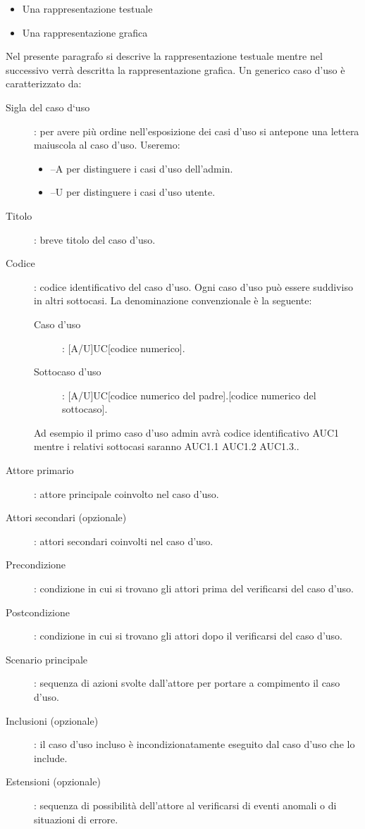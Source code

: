 \documentclass[../norme-di-progetto.tex]{subfiles}
\begin{document}
\begin{itemize}
  \item Una rappresentazione testuale
  \item Una rappresentazione grafica
\end{itemize}

Nel presente paragrafo si descrive la rappresentazione testuale mentre nel successivo verrà descritta la rappresentazione grafica. Un generico caso d'uso è caratterizzato da:
\begin{description}
  \item [Sigla del caso d`uso]: per avere più ordine nell'esposizione dei casi d'uso si antepone una lettera maiuscola al caso d'uso. Useremo:
  \begin{itemize}
   \item --A per distinguere i casi d'uso dell'admin.
   \item --U per distinguere i casi d'uso utente.
  \end{itemize}
  \item [Titolo]: breve titolo del caso d'uso.
  \item [Codice]: codice identificativo del caso d'uso. Ogni caso d'uso può essere suddiviso in altri sottocasi. La denominazione convenzionale è la seguente:
        \begin{description}
          \item [Caso d'uso]: [A/U]UC[codice numerico].
          \item [Sottocaso d'uso]: [A/U]UC[codice numerico del padre].[codice numerico del sottocaso].
        \end{description}
        Ad esempio il primo caso d'uso admin avrà codice identificativo AUC1 mentre i relativi sottocasi saranno AUC1.1 AUC1.2 AUC1.3..
  \item [Attore primario]: attore principale coinvolto nel caso d'uso.
  \item [Attori secondari (opzionale)]: attori secondari coinvolti nel caso d'uso.
  \item [Precondizione]: condizione in cui si trovano gli attori prima del verificarsi del caso d'uso.
  \item [Postcondizione]: condizione in cui si trovano gli attori dopo il verificarsi del caso d'uso.
  \item [Scenario principale]: sequenza di azioni svolte dall'attore per portare a compimento il caso d'uso.
  \item [Inclusioni (opzionale)]: il caso d'uso incluso è incondizionatamente eseguito dal caso d'uso che lo include.
  \item [Estensioni (opzionale)]: sequenza di possibilità dell'attore al verificarsi di eventi anomali o di situazioni di errore.
\end{description}
\end{document}
